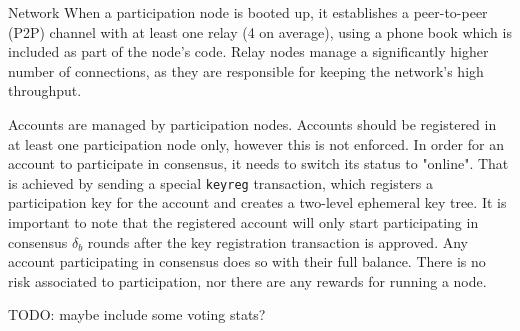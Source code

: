 \documentclass[10pt,a4paper]{article}
\begin{document}
\begin{section}{Network}
When a participation node is booted up, it establishes a peer-to-peer (P2P) 
channel with at least one relay (4 on average), using a phone book which is included
as part of the node's code. 
Relay nodes manage a significantly higher number of connections, as they 
are responsible for keeping the network's high throughput.

Accounts are managed by participation nodes. Accounts should be registered in at least one participation
node only, however this is not enforced.
In order for an account to participate in consensus, it needs to switch its status to "online". 
That is achieved by sending a special {\tt keyreg} transaction,
which registers a participation key for the account and creates a two-level ephemeral key tree.
It is important to note that the registered account will only start participating in consensus
$\delta_b$ rounds after the key registration transaction is approved.
Any account participating in consensus does so with their full balance. There is no risk
associated to participation, nor there are any rewards for running a node.

TODO: maybe include some voting stats?

\end{section}
\end{document}
